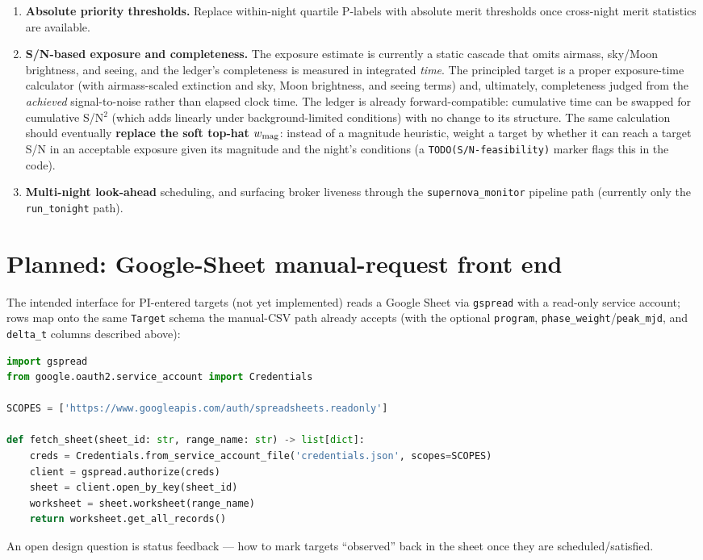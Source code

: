 \documentclass[11pt,letterpaper]{article}
\begin{document}
\begin{enumerate}[nosep]
  bucket and required time.
  \item \textbf{Absolute priority thresholds.} Replace within-night quartile P-labels with
  absolute merit thresholds once cross-night merit statistics are available.
  \item \textbf{S/N-based exposure and completeness.} The exposure estimate is currently a
  static cascade that omits airmass, sky/Moon brightness, and seeing, and the ledger's
  completeness is measured in integrated \emph{time}. The principled target is a proper
  exposure-time calculator (with airmass-scaled extinction and sky, Moon brightness, and
  seeing terms) and, ultimately, completeness judged from the \emph{achieved} signal-to-noise
  rather than elapsed clock time. The ledger is already forward-compatible: cumulative time
  can be swapped for cumulative S/N$^2$ (which adds linearly under background-limited
  conditions) with no change to its structure. The same calculation should eventually
  \textbf{replace the soft top-hat $w_{\rm mag}$}: instead of a magnitude heuristic, weight a
  target by whether it can reach a target S/N in an acceptable exposure given its magnitude
  and the night's conditions (a \texttt{TODO(S/N-feasibility)} marker flags this in the code).
  \item \textbf{Multi-night look-ahead} scheduling, and surfacing broker liveness through the
  \texttt{supernova\_monitor} pipeline path (currently only the \texttt{run\_tonight} path).
\end{enumerate}

\section{Planned: Google-Sheet manual-request front end}\label{sec:sheet}
The intended interface for PI-entered targets (not yet implemented) reads a Google Sheet via
\texttt{gspread} with a read-only service account; rows map onto the same \texttt{Target}
schema the manual-CSV path already accepts (with the optional \texttt{program},
\texttt{phase\_weight}/\texttt{peak\_mjd}, and \texttt{delta\_t} columns described above):
\begin{lstlisting}[language=Python]
import gspread
from google.oauth2.service_account import Credentials

SCOPES = ['https://www.googleapis.com/auth/spreadsheets.readonly']

def fetch_sheet(sheet_id: str, range_name: str) -> list[dict]:
    creds = Credentials.from_service_account_file('credentials.json', scopes=SCOPES)
    client = gspread.authorize(creds)
    sheet = client.open_by_key(sheet_id)
    worksheet = sheet.worksheet(range_name)
    return worksheet.get_all_records()
\end{lstlisting}
An open design question is status feedback --- how to mark targets ``observed'' back in the
sheet once they are scheduled/satisfied.
\end{document}
